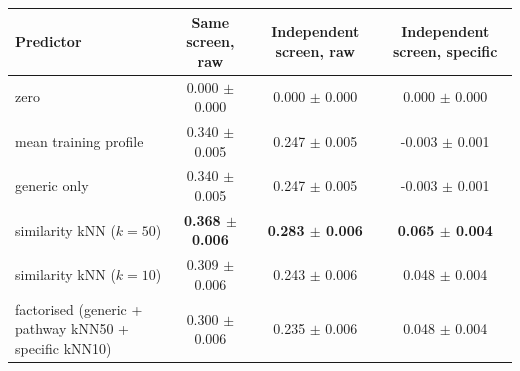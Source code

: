 \begin{tabular}{lccc}
\toprule
Predictor & Same screen, raw & Independent screen, raw & Independent screen, specific \\
\midrule
zero & 0.000 $\pm$ 0.000 & 0.000 $\pm$ 0.000 & 0.000 $\pm$ 0.000 \\
mean training profile & 0.340 $\pm$ 0.005 & 0.247 $\pm$ 0.005 & -0.003 $\pm$ 0.001 \\
generic only & 0.340 $\pm$ 0.005 & 0.247 $\pm$ 0.005 & -0.003 $\pm$ 0.001 \\
similarity kNN ($k{=}50$) & \textbf{0.368 $\pm$ 0.006} & \textbf{0.283 $\pm$ 0.006} & \textbf{0.065 $\pm$ 0.004} \\
similarity kNN ($k{=}10$) & 0.309 $\pm$ 0.006 & 0.243 $\pm$ 0.006 & 0.048 $\pm$ 0.004 \\
factorised (generic + pathway kNN50 + specific kNN10) & 0.300 $\pm$ 0.006 & 0.235 $\pm$ 0.006 & 0.048 $\pm$ 0.004 \\
\bottomrule
\end{tabular}
